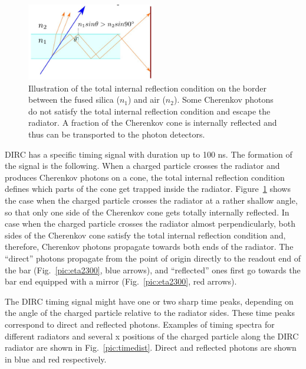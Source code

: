 \begin{figure}[!h]
\centering
\includegraphics[width=0.5\textwidth]{pics/bas2.png}
\caption{\label{pic:bas2}
Illustration of the total internal reflection condition on the border between the fused silica ($n_{1}$) and air ($n_{2}$). Some Cherenkov photons do not satisfy the total internal reflection condition and escape the radiator. A fraction of the Cherenkov cone is internally reflected and thus can be transported to the photon detectors.
}
\end{figure}

DIRC has a specific timing signal with duration up to 100 ns. The formation of the signal is the following. When a charged particle crosses the radiator and produces Cherenkov photons on a cone, the total internal reflection condition defines which parts of the cone get trapped inside the radiator. Figure~\ref{pic:bas2} shows the case when the charged particle crosses the radiator at a rather shallow angle, so that only one side of the Cherenkov cone gets totally internally reflected. In case when the charged particle crosses the radiator almost perpendicularly, both sides of the Cherenkov cone satisfy the total internal reflection condition and, therefore, Cherenkov photons propagate towards both ends of the radiator. The ``direct'' photons propagate from the point of origin directly to the readout end of the bar (Fig.~\ref{pic:eta2300}, blue arrows), and ``reflected'' ones first go towards the bar end equipped with a mirror (Fig.~\ref{pic:eta2300}, red arrows). 

The DIRC timing signal might have one or two sharp time peaks, depending on the angle of the charged particle relative to the radiator sides. These time peaks correspond to direct and reflected photons. Examples of timing spectra for different radiators and several x positions of the charged particle along the DIRC radiator are shown in Fig.~\ref{pic:timedist}. Direct and reflected photons are shown in blue and red respectively.

